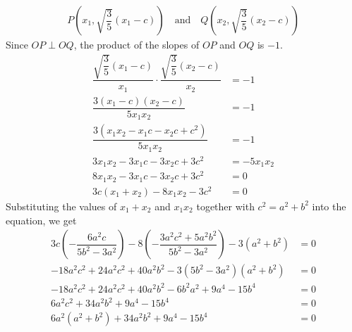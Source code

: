 \documentclass{report}
\begin{document}
\begin{enumerate}
          \begin{align*}
              P\left(x_1, \sqrt{\dfrac{3}{5}}(x_1 - c)\right) \quad \text{and} \quad Q\left(x_2, \sqrt{\dfrac{3}{5}}(x_2 - c)\right)
          \end{align*}
          Since $OP \perp OQ$, the product of the slopes of $OP$ and $OQ$ is $-1$.
          \begin{align*}
              \dfrac{\sqrt{\dfrac{3}{5}}(x_1 - c)}{x_1} \cdot \dfrac{\sqrt{\dfrac{3}{5}}(x_2 - c)}{x_2} & = -1       \\
              \dfrac{3(x_1 - c)(x_2 - c)}{5x_1x_2}                                                      & = -1       \\
              \dfrac{3(x_1x_2 - x_1c - x_2c + c^2)}{5x_1x_2}                                            & = -1       \\
              3x_1x_2 - 3x_1c - 3x_2c + 3c^2                                                            & = -5x_1x_2 \\
              8x_1x_2 - 3x_1c - 3x_2c + 3c^2                                                            & = 0        \\
              3c(x_1 + x_2) - 8x_1x_2 - 3c^2                                                            & = 0
          \end{align*}
          Substituting the values of $x_1 + x_2$ and $x_1x_2$ together with $c^2 = a^2 + b^2$ into the equation, we get
          \begin{align*}
              3c\left(-\dfrac{6a^2c}{5b^2 - 3a^2}\right) - 8\left(-\dfrac{3a^2c^2 + 5a^2b^2}{5b^2 - 3a^2}\right) - 3(a^2 + b^2) & = 0                                            \\
              -18a^2c^2 + 24a^2c^2 + 40a^2b^2 - 3(5b^2 - 3a^2)(a^2 + b^2)                                                       & = 0                                            \\
              -18a^2c^2 + 24a^2c^2 + 40a^2b^2 - 6b^2a^2 + 9a^4 - 15b^4                                                          & = 0                                            \\
              6a^2c^2 + 34a^2b^2 + 9a^4 - 15b^4                                                                                 & = 0                                            \\
              6a^2(a^2 + b^2) + 34a^2b^2 + 9a^4 - 15b^4                                                                         & = 0                                            \\

\end{align*}
\end{enumerate}
\end{document}
